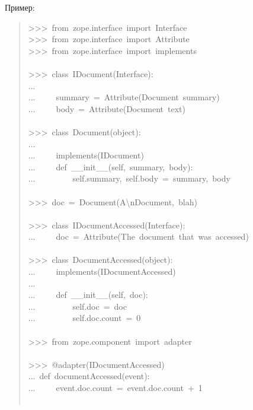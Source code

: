 \documentclass[a4paper,openany,twoside,final]{book}
\begin{document}
Пример:

\begin{quote}{\ttfamily \raggedright \noindent
>{}>{}>~from~zope.interface~import~Interface\\
>{}>{}>~from~zope.interface~import~Attribute\\
>{}>{}>~from~zope.interface~import~implements\\
~\\
>{}>{}>~class~IDocument(Interface):\\
...\\
...~~~~~summary~=~Attribute(\textquotedbl{}Document~summary\textquotedbl{})\\
...~~~~~body~=~Attribute(\textquotedbl{}Document~text\textquotedbl{})\\
~\\
>{}>{}>~class~Document(object):\\
...\\
...~~~~~implements(IDocument)\\
...~~~~~def~\_\_init\_\_(self,~summary,~body):\\
...~~~~~~~~~self.summary,~self.body~=~summary,~body\\
~\\
>{}>{}>~doc~=~Document(\textquotedbl{}A\textbackslash{}nDocument\textquotedbl{},~\textquotedbl{}blah\textquotedbl{})\\
~\\
>{}>{}>~class~IDocumentAccessed(Interface):\\
...~~~~~doc~=~Attribute(\textquotedbl{}The~document~that~was~accessed\textquotedbl{})\\
~\\
>{}>{}>~class~DocumentAccessed(object):\\
...~~~~~implements(IDocumentAccessed)\\
...\\
...~~~~~def~\_\_init\_\_(self,~doc):\\
...~~~~~~~~~self.doc~=~doc\\
...~~~~~~~~~self.doc.count~=~0\\
~\\
>{}>{}>~from~zope.component~import~adapter\\
~\\
>{}>{}>~@adapter(IDocumentAccessed)\\
...~def~documentAccessed(event):\\
...~~~~~event.doc.count~=~event.doc.count~+~1\\
~\\
}
\end{quote}
\end{document}
